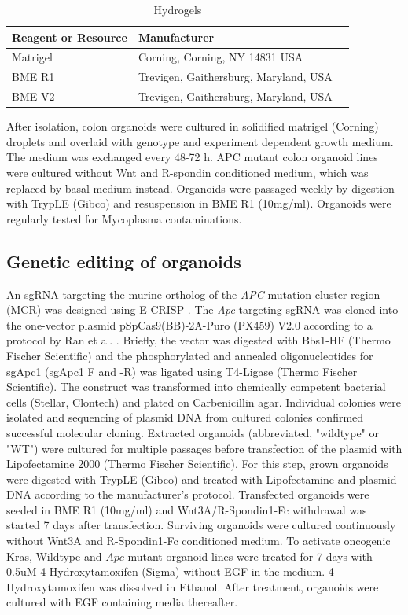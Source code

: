 \begin{flushleft}
\begin{table}[htb]
\caption{Hydrogels}
\label{tab:hydrogels} %
\begin{tabularx}{\textwidth}{XlX}
\toprule
\textbf{Reagent or Resource} & \textbf{Manufacturer} \\
\midrule
Matrigel & Corning, Corning, NY 14831 USA \\
BME R1 & Trevigen, Gaithersburg, Maryland, USA \\
BME V2 & Trevigen, Gaithersburg, Maryland, USA \\
\bottomrule
\end{tabularx}
\end{table}

After isolation, colon organoids were cultured in solidified matrigel (Corning) droplets and overlaid with genotype and experiment dependent growth medium. The medium was exchanged every 48-72 h. 
APC mutant colon organoid lines were cultured without Wnt and R-spondin conditioned medium, which was replaced by basal medium instead.
Organoids were passaged weekly by digestion with TrypLE (Gibco) and resuspension in BME R1 (10mg/ml). 
Organoids were regularly tested for Mycoplasma contaminations.  

\subsection{Genetic editing of organoids}
An sgRNA targeting the murine ortholog of the \textit{APC} mutation cluster region (MCR) was designed using E-CRISP \parencite{heigwerECRISPFastCRISPR2014}. The \textit{Apc} targeting sgRNA was cloned into the one-vector plasmid pSpCas9(BB)-2A-Puro (PX459) V2.0 according to a protocol by Ran et al. \parencite{ranGenomeEngineeringUsing2013}. Briefly, the vector was digested with Bbs1-HF (Thermo Fischer Scientific) and the phosphorylated and annealed oligonucleotides for sgApc1 (sgApc1 F and -R) was ligated using T4-Ligase (Thermo Fischer Scientific). The construct was transformed into chemically competent bacterial cells (Stellar, Clontech) and plated on Carbenicillin agar. Individual colonies were isolated and sequencing of plasmid DNA from cultured colonies confirmed successful molecular cloning.   
Extracted organoids (abbreviated, "wildtype" or "WT") were cultured for multiple passages before transfection of the plasmid with Lipofectamine 2000 (Thermo Fischer Scientific). For this step, grown organoids were digested with TrypLE (Gibco) and treated with Lipofectamine and plasmid DNA according to the manufacturer’s protocol. Transfected organoids were seeded in BME R1 (10mg/ml) and Wnt3A/R-Spondin1-Fc withdrawal was started 7 days after transfection. Surviving organoids were cultured continuously without Wnt3A and R-Spondin1-Fc conditioned medium.
To activate oncogenic Kras, Wildtype and $Apc$ mutant organoid lines were treated for 7 days with 0.5uM 4-Hydroxytamoxifen (Sigma) without EGF in the medium. 4-Hydroxytamoxifen was dissolved in Ethanol. After treatment, organoids were cultured with EGF containing media thereafter.


\end{flushleft}
